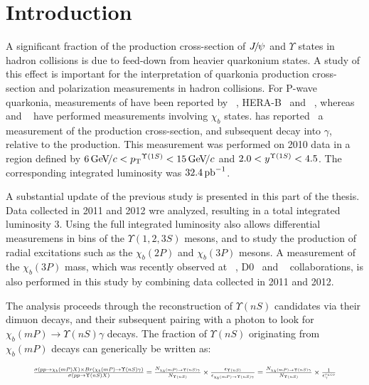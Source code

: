 \section{Introduction}
\label{sec:introduction}

A significant fraction of the production cross-section of ${{J\mskip -3mu/\mskip -2mu\psi\mskip 2mu}}$ and
$\Upsilon$ states in hadron collisions is due to feed-down from heavier
quarkonium states. A study of this effect is important for the interpretation of
quarkonia production cross-section and polarization measurements in hadron
collisions. For P-wave quarkonia, measurements of \chic have been reported by
\cdf~\cite{Abulencia:2007bra}, HERA-B~\cite{Abt:2008ed}
and \lhcb~\cite{LHCb-PAPER-2011-019}, whereas \cdf~\cite{Affolder:1999wm} and 
\atlas~\cite{Aad:2011ih} have performed measurements involving $\chi_b$ states.
\lhcb has reported~\cite{LHCb-PAPER-2012-015} a measurement of
the \chibOneP production cross-section, and subsequent decay into \OneS $\gamma$,
relative to the \OneS production. This measurement was performed on 2010 data
in a region defined by $6 \gevc < \pt^{\Y1S} < 15 \gevc$ and
$2.0 < y^{\Y1S} < 4.5$. The corresponding integrated luminosity was $32.4\mbox{\,pb}^{-1}$.

A substantial update of the previous \lhcb study is presented in this part of
the thesis. Data collected in 2011 and 2012 wre analyzed, resulting in a total
integrated luminosity 3\invfb. Using the full integrated luminosity also allows
differential measuremens in \pt bins of the $\Upsilon(1,2,3S)$ mesons, and to
study the production of radial excitations such as the $\chi_b(2P)$ and
$\chi_b(3P)$ mesons. A measurement of the $\chi_b(3P)$ mass, which was recently
observed at \atlas~\cite{Aad:2011ih}, D0~\cite{Abazov:2012gh} and
\lhcb~\cite{LHCb-CONF-2012-020} collaborations, is also performed in this study by
combining data collected in 2011 and 2012.

The analysis proceeds through the reconstruction of $\Upsilon(nS)$ candidates
via their dimuon decays, and their subsequent pairing with a photon to look for
$\chi_b(mP) \to \Upsilon(nS) \gamma$ decays.  The fraction of $\Upsilon(nS)$
originating from $\chi_b(mP)$ decays can generically be written as:

\begin{equation}
\resizebox{.9\hsize}{!}{
$
\frac{\sigma(pp \to \chi_b (mP) X) \times Br (\chi_b (mP) \to \Upsilon(nS) \gamma)}{\sigma(pp \to \Upsilon(nS) X)} =
\frac{N_{\chi_b (mP)\to \Upsilon(nS) \gamma}}{N_{\Upsilon(nS)}} \times \frac{\epsilon_{\Upsilon(nS)}}{\epsilon_{\chi_b (mP)\to \Upsilon(nS) \gamma}} =
\frac{N_{\chi_b (mP)\to \Upsilon(nS) \gamma}}{N_{\Upsilon(nS)}} \times \frac{1}{\epsilon^{reco}_{\gamma}}
$
}
\label{eqn:master}
\end{equation}


